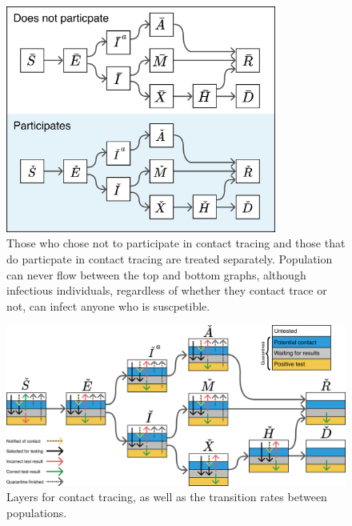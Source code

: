 \documentclass[notitlepage, superscriptaddress]{revtex4-2}
\begin{document}
\begin{figure}
\centering
\includegraphics[width=3.5in]{SEIR with contact tracing}
\caption{\label{f:SEIR-contactSeparation}
 Those who chose not to participate in contact tracing and those that do particpate in contact tracing are treated separately. Population can never flow between the top and bottom graphs, although infectious individuals, regardless of whether they contact trace or not, can infect anyone who is suscpetible.}
\end{figure}

\begin{figure}
\centering
\includegraphics[width=6.5in]{SEIR-CT_4layer}
\caption{\label{f:SEIR-contact}
 Layers for contact tracing, as well as the transition rates between populations.}
\end{figure}


\end{document}
